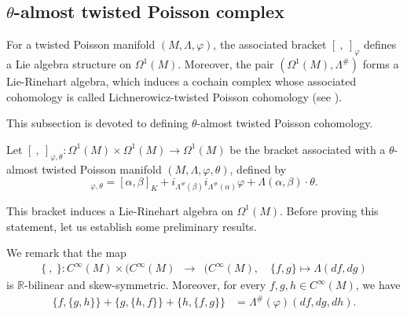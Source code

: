 \documentclass[a4paper,10pt]{article}
\numberwithin{equation}{section}
\theoremstyle{plain}
\begin{document}
	
	\subsection{$\theta$-almost twisted Poisson complex}



For a twisted Poisson manifold $(M,\Lambda,\varphi)$, the associated bracket $[\ ,\ ]_{\varphi}$ defines a Lie algebra structure on $\Omega^1(M)$. Moreover, the pair $(\Omega^1(M),\Lambda^{\#})$ forms a Lie-Rinehart algebra, which induces a cochain complex whose associated cohomology is called Lichnerowicz-twisted Poisson cohomology (see \cite{R11,R2,R20}).

This subsection is devoted to defining $\theta$-almost twisted Poisson cohomology.

Let $[\ ,\ ]_{\varphi,\theta}: \Omega^1(M) \times \Omega^1(M) \longrightarrow \Omega^1(M)$ be the bracket associated with a $\theta$-almost twisted Poisson manifold $(M, \Lambda, \varphi, \theta)$, defined by
\begin{equation}
	[\alpha, \beta]_{\varphi, \theta} = [\alpha, \beta]_K + i_{\Lambda^{\#}(\beta)} i_{\Lambda^{\#}(\alpha)} \varphi + \Lambda(\alpha, \beta) \cdot \theta. \label{expresscrochet}
\end{equation}

This bracket induces a Lie-Rinehart algebra on $\Omega^1(M)$. Before proving this statement, let us establish some preliminary results.

We remark that the map
			\begin{eqnarray}
				\{\ ,\ \}: C^\infty(M)\times (C^\infty(M)&\longrightarrow& (C^\infty(M),\quad   \{f,g\}\mapsto \Lambda(df,dg)
			\end{eqnarray}is $\mathbb{R}$-bilinear and skew-symmetric. Moreover, for every $f,g,h \in C^\infty(M)$, we have
			\begin{align}\label{Jac}
				\{f,\{g,h\}\}+\{g,\{h,f\}\}+\{h,\{f,g\}\}&=\Lambda^{\#}(\varphi)(df,dg,dh).
			\end{align}
\end{document}
